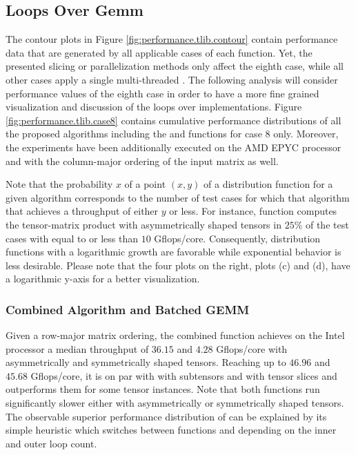 



\subsection{Loops Over Gemm}
The contour plots in Figure \ref{fig:performance.tlib.contour} contain performance data that are generated by all applicable cases of each  function.
Yet, the presented slicing or parallelization methods only affect the eighth case, while all other cases apply a single multi-threaded .
The following analysis will consider performance values of the eighth case in order to have a more fine grained visualization and discussion of the loops over  implementations.
Figure \ref{fig:performance.tlib.case8} contains cumulative performance distributions of all the proposed algorithms including the   and  functions for case 8 only.
Moreover, the experiments have been additionally executed on the AMD EPYC processor and with the column-major ordering of the input matrix as well.

Note that the probability $x$ of a point $(x,y)$ of a distribution function for a given algorithm corresponds to the number of test cases for which that algorithm that achieves a throughput of either $y$ or less.
For instance, function  computes the tensor-matrix product with asymmetrically shaped tensors in $25$\% of the test cases with equal to or less than $10$ Gflops/core.
Consequently, distribution functions with a logarithmic growth are favorable while exponential behavior is less desirable.
Please note that the four plots on the right, plots (c) and (d), have a logarithmic y-axis for a better visualization.


\subsubsection{Combined Algorithm and Batched GEMM}
Given a row-major matrix ordering, the combined function  achieves on the Intel processor a median throughput of $36.15$ and $4.28$ Gflops/core with asymmetrically and symmetrically shaped tensors.
Reaching up to $46.96$ and $45.68$ Gflops/core, it is on par with  with subtensors and  with tensor slices and outperforms them for some tensor instances.
Note that both functions run significantly slower either with asymmetrically or symmetrically shaped tensors.
The observable superior performance distribution of  can be explained by its simple heuristic which switches between functions  and  depending on the inner and outer loop count.

